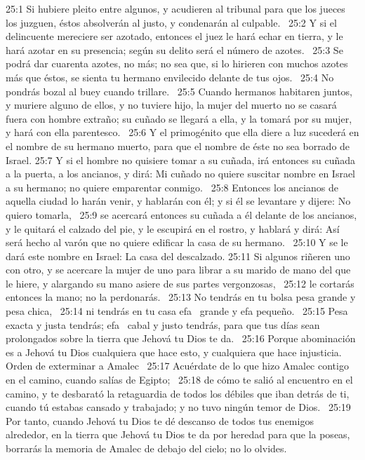 25:1 Si hubiere pleito entre algunos, y acudieren al tribunal para que los jueces los juzguen, éstos absolverán al justo, y condenarán al culpable.  
25:2 Y si el delincuente mereciere ser azotado, entonces el juez le hará echar en tierra, y le hará azotar en su presencia; según su delito será el número de azotes.  
25:3 Se podrá dar cuarenta azotes, no más; no sea que, si lo hirieren con muchos azotes más que éstos, se sienta tu hermano envilecido delante de tus ojos.  
25:4 No pondrás bozal al buey cuando trillare.  
25:5 Cuando hermanos habitaren juntos, y muriere alguno de ellos, y no tuviere hijo, la mujer del muerto no se casará fuera con hombre extraño; su cuñado se llegará a ella, y la tomará por su mujer, y hará con ella parentesco.  
25:6 Y el primogénito que ella diere a luz sucederá en el nombre de su hermano muerto, para que el nombre de éste no sea borrado de Israel. 
25:7 Y si el hombre no quisiere tomar a su cuñada, irá entonces su cuñada a la puerta, a los ancianos, y dirá: Mi cuñado no quiere suscitar nombre en Israel a su hermano; no quiere emparentar conmigo.  
25:8 Entonces los ancianos de aquella ciudad lo harán venir, y hablarán con él; y si él se levantare y dijere: No quiero tomarla,  
25:9 se acercará entonces su cuñada a él delante de los ancianos, y le quitará el calzado del pie, y le escupirá en el rostro, y hablará y dirá: Así será hecho al varón que no quiere edificar la casa de su hermano.  
25:10 Y se le dará este nombre en Israel: La casa del descalzado. 
25:11 Si algunos riñeren uno con otro, y se acercare la mujer de uno para librar a su marido de mano del que le hiere, y alargando su mano asiere de sus partes vergonzosas,  
25:12 le cortarás entonces la mano; no la perdonarás.  
25:13 No tendrás en tu bolsa pesa grande y pesa chica,  
25:14 ni tendrás en tu casa efa  grande y efa pequeño.  
25:15 Pesa exacta y justa tendrás; efa  cabal y justo tendrás, para que tus días sean prolongados sobre la tierra que Jehová tu Dios te da.  
25:16 Porque abominación es a Jehová tu Dios cualquiera que hace esto, y cualquiera que hace injusticia. 
Orden de exterminar a Amalec  
25:17 Acuérdate de lo que hizo Amalec contigo en el camino, cuando salías de Egipto;  
25:18 de cómo te salió al encuentro en el camino, y te desbarató la retaguardia de todos los débiles que iban detrás de ti, cuando tú estabas cansado y trabajado; y no tuvo ningún temor de Dios.  
25:19 Por tanto, cuando Jehová tu Dios te dé descanso de todos tus enemigos alrededor, en la tierra que Jehová tu Dios te da por heredad para que la poseas, borrarás la memoria de Amalec de debajo del cielo; no lo olvides. 
